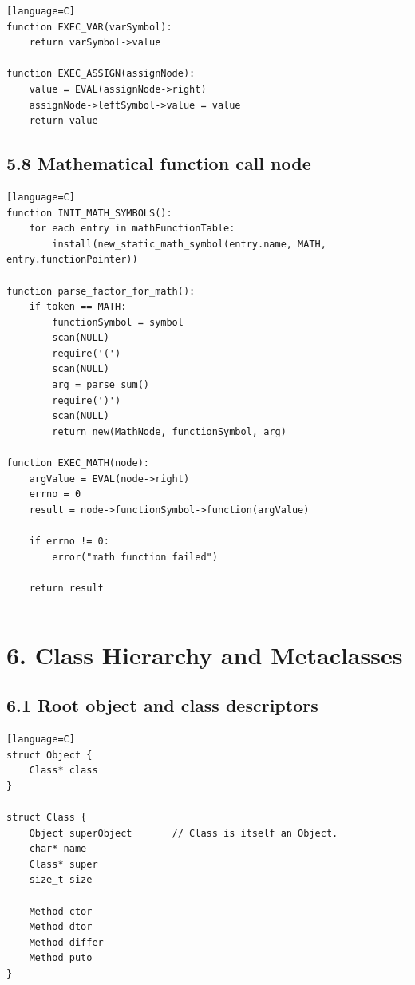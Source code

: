 \documentclass[11pt]{article}
\begin{document}
\begin{verbatim}[language=C]
function EXEC_VAR(varSymbol):
    return varSymbol->value

function EXEC_ASSIGN(assignNode):
    value = EVAL(assignNode->right)
    assignNode->leftSymbol->value = value
    return value
\end{verbatim}

\subsection{5.8 Mathematical function call
node}\label{mathematical-function-call-node}

\begin{verbatim}[language=C]
function INIT_MATH_SYMBOLS():
    for each entry in mathFunctionTable:
        install(new_static_math_symbol(entry.name, MATH, entry.functionPointer))

function parse_factor_for_math():
    if token == MATH:
        functionSymbol = symbol
        scan(NULL)
        require('(')
        scan(NULL)
        arg = parse_sum()
        require(')')
        scan(NULL)
        return new(MathNode, functionSymbol, arg)

function EXEC_MATH(node):
    argValue = EVAL(node->right)
    errno = 0
    result = node->functionSymbol->function(argValue)

    if errno != 0:
        error("math function failed")

    return result
\end{verbatim}

\begin{center}\rule{0.5\linewidth}{0.5pt}\end{center}

\section{6. Class Hierarchy and
Metaclasses}\label{class-hierarchy-and-metaclasses}

\subsection{6.1 Root object and class
descriptors}\label{root-object-and-class-descriptors}

\begin{verbatim}[language=C]
struct Object {
    Class* class
}

struct Class {
    Object superObject       // Class is itself an Object.
    char* name
    Class* super
    size_t size

    Method ctor
    Method dtor
    Method differ
    Method puto
}
\end{verbatim}
\end{document}
